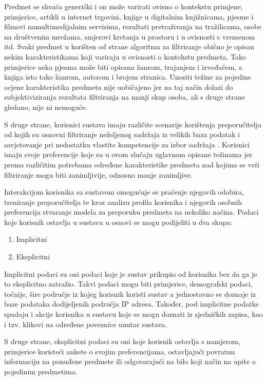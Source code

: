 \documentclass[times, utf8, diplomski, numeric]{fer}
\begin{document}
Predmet se shvaća generički i on može varirati ovisno o kontekstu primjene,
primjerice, artikli u internet trgovini, knjige u digitalnim knjižnicama, pjesme
i filmovi namultimedijalnim servisima, rezultati pretraživanja na tražilicama,
osobe na društvenim mrežama, smjerovi kretanja u prostoru i u ovisnosti s
vremenom itd. Svaki predmet u korišten od strane algoritma za filtriranje obično
je opisan nekim karakteristikama koji variraju u ovisnosti o kontekstu predmeta.
Tako primjerice neka pjesma može biti opisana žanrom, trajanjem i izvođačem, a
knjiga isto tako žanrom, autorom i brojem stranica. Unositi težine za pojedine
ocjene karakteristika predmeta nije uobičajeno jer na taj način dolazi do
subjektiviziranja rezultata filtriranja na manji skup osoba, ali s druge strane
gledano, nije ni nemoguće.

S druge strane, korisnici sustava imaju različite scenarije korištenja
preporučitelja od kojih su osnovni filtriranje neželjenog sadržaja iz velikih
baza podatak i savjetovanje pri nedostatku vlastite kompetencije za izbor
sadržaja \cite{AskIda}. Korisnici imaju svoje preferencije koje su u ovom
slučaju uglavnom opisane težinama jer prema različitim potrebama određene
karakteristike predmeta nad kojima se vrši filtriranje mogu biti zanimljivije,
odnosno manje zanimljive.

Interakcijom korisnika sa sustavom omogućuje se praćenje njegovih odabira,
treniranje preporučitelja te kroz analizu profila korisnika i njegovih osobnih
preferencija stvaranje modela za preporuku predmeta na nekoliko načina. Podaci
koje korisnik ostavlja u sustavu u osnovi se mogu podijeliti u dva skupa:
\begin{enumerate}
  \item Implicitni
  \item Eksplicitni
\end{enumerate}
Implicitni podaci su oni podaci koje je sustav prikupio od korisnika bez da ga
je to eksplicitno zatražio. Takvi podaci mogu biti primjerice, demografski
podaci, točnije, šire područje iz kojeg korisnik koristi sustav a jednostavno se
doznaje iz baze podataka dodijeljenih područja  IP adresa.
Također, pod implicitne podatke spadaju i akcije korisnika u sustavu koje se
mogu doznati iz sjedničkih zapisa, kao i tzv. klikovi na određene poveznice
unutar sustava.

S druge strane, eksplicitni podaci su oni koje korisnik ostavlja s namjerom,
primjerice koristeći ankete o svojim preferencijama, ostavljajući povratnu
informaciju na ponuđene predmete  ili odgovarajući na bilo
koji način na upite o pojedinim predmetima.
\end{document}
